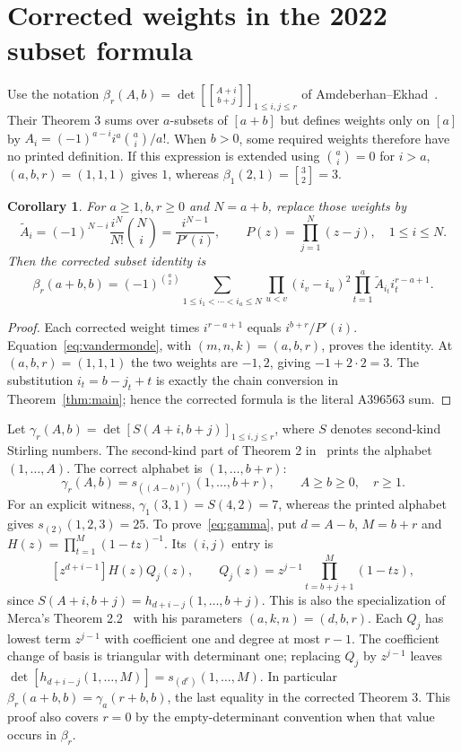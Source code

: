 \documentclass[11pt]{article}
\newtheorem{corollary}[theorem]{Corollary}
\newcommand{\stir}[2]{\genfrac{[}{]}{0pt}{}{#1}{#2}}
\newcommand{\Schur}{s}
\begin{document}
\section{Corrected weights in the 2022 subset formula}\label{sec:correction}
Use the notation $\beta_r(A,b)=\det[\stir{A+i}{b+j}]_{1\leq i,j\leq r}$
of Amdeberhan--Ekhad~\cite{ae}.
Their Theorem 3 sums over $a$-subsets of $[a+b]$ but defines weights only on
$[a]$ by $A_i=(-1)^{a-i}i^a\binom ai/a!$.
When $b>0$, some required weights therefore have no printed definition.
If this expression is extended using $\binom ai=0$ for $i>a$,
$(a,b,r)=(1,1,1)$ gives $1$, whereas $\beta_1(2,1)=\stir32=3$.

\begin{corollary}\label{cor:weights}
For $a\geq1,b,r\geq0$ and $N=a+b$, replace those weights by
\[
\widetilde A_i=(-1)^{N-i}\frac{i^N}{N!}\binom Ni
              =\frac{i^{N-1}}{P'(i)},\qquad
P(z)=\prod_{j=1}^N(z-j),\quad 1\leq i\leq N.
\]
Then the corrected subset identity is
\[
\beta_r(a+b,b)=(-1)^{\binom a2}
\sum_{1\leq i_1<\cdots<i_a\leq N}
\prod_{u<v}(i_v-i_u)^2\prod_{t=1}^a\widetilde A_{i_t}i_t^{r-a+1}.
\]
\end{corollary}
\begin{proof}
Each corrected weight times $i^{r-a+1}$ equals $i^{b+r}/P'(i)$.
Equation~\eqref{eq:vandermonde}, with $(m,n,k)=(a,b,r)$, proves the identity.
At $(a,b,r)=(1,1,1)$ the two weights are $-1,2$, giving $-1+2\cdot2=3$.
The substitution $i_t=b-j_t+t$ is exactly the chain conversion in
Theorem~\ref{thm:main}; hence the corrected formula is the literal A396563 sum.
\end{proof}

Let $\gamma_r(A,b)=\det[S(A+i,b+j)]_{1\leq i,j\leq r}$, where $S$ denotes
second-kind Stirling numbers. The second-kind part of Theorem 2 in~\cite{ae}
prints the alphabet $(1,\ldots,A)$. The correct alphabet is $(1,\ldots,b+r)$:
\begin{equation}\label{eq:gamma}
\gamma_r(A,b)=\Schur_{((A-b)^r)}(1,\ldots,b+r),\qquad A\geq b\geq0,\quad r\geq1.
\end{equation}
For an explicit witness, $\gamma_1(3,1)=S(4,2)=7$,
whereas the printed alphabet gives $\Schur_{(2)}(1,2,3)=25$.
To prove~\eqref{eq:gamma}, put $d=A-b$, $M=b+r$ and
$H(z)=\prod_{t=1}^M(1-tz)^{-1}$. Its $(i,j)$ entry is
\[
[z^{d+i-1}]H(z)Q_j(z),\qquad
Q_j(z)=z^{j-1}\prod_{t=b+j+1}^{M}(1-tz),
\]
since $S(A+i,b+j)=h_{d+i-j}(1,\ldots,b+j)$.
This is also the specialization of Merca's Theorem 2.2~\cite{merca}
with his parameters $(a,k,n)=(d,b,r)$.
Each $Q_j$ has lowest term $z^{j-1}$ with coefficient one and degree at most
$r-1$. The coefficient change of basis is triangular with determinant one;
replacing $Q_j$ by $z^{j-1}$ leaves
$\det[h_{d+i-j}(1,\ldots,M)]=\Schur_{(d^r)}(1,\ldots,M)$.
In particular $\beta_r(a+b,b)=\gamma_a(r+b,b)$, the last equality
in the corrected Theorem 3. This proof also covers $r=0$ by the empty-determinant
convention when that value occurs in $\beta_r$.
\end{document}
